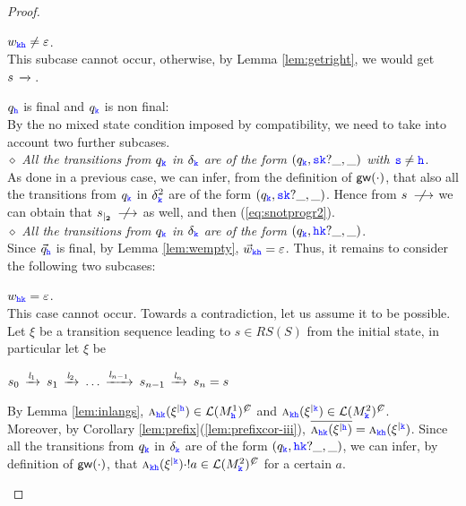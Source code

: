 \begin{proof}
\begin{description}
\begin{description}
\item 
$w_{\KK\HH}\neq\varepsilon$.\\
This subcase cannot occur, otherwise, by Lemma \ref{lem:getright}, we would get $s\lts{}$.
\end{description}


\item $q_\HH$ is final and $q_\KK$ is non final: \\
By the no mixed state condition imposed by compatibility, we need to take into account two further subcases.\\
\underline{$\diamond$} 
{\em  All the transitions from $q_\KK$ in $\delta_\KK$ are of the form $(q_\KK,\tts\KK?\_,\_)$ with $\tts\neq\HH$}.\\
As done in a previous case,  we can infer, from the definition of  $\gateway{\cdot}$, that also  all the transitions from $q_\KK$ in $\delta^2_\KK$ are of the form $(q_\KK,\tts\KK?\_,\_)$. Hence from $s\notlts{}$ we can  
obtain that $\restrict{s}{2}\notlts{}$ as well, and then  (\ref{eq:snotprogr2}).\\
\underline{$\diamond$} 
{\em  All the transitions from $q_\KK$ in $\delta_\KK$ are of the form $(q_\KK,\HH\KK?\_,\_)$}.\\
Since $\vec{q}_\HH$ is final, by Lemma \ref{lem:wempty}, $\vec{w}_{\KK\HH} = \varepsilon$. Thus, it remains to consider the following two subcases:
 \begin{description}
 \item
 ${w}_{\HH\KK}=\varepsilon$.\\
 This case cannot occur. Towards a contradiction, let us assume it to be possible.\\
Let $\xi$ be a transition sequence leading to $s\in RS(S)$ from the initial state, in particular let $\xi$ be\\
\centerline{
$s_0\lts{\elle_1}s_1\lts{\elle_2} \ldots \lts{\elle_{n-1}}s_{n-1}\lts{\elle_n}s_n=s$
}
 By Lemma \ref{lem:inlangs},
 $\symb{\HH\KK}{\restrictup{\xi}{\HH}}\in\lang{M^1_\HH}^\mC $ and $\symb{\KK\HH}{\restrictup{\xi}{\KK}}\in\lang{M^2_\KK}^\mC$. \\
 Moreover, by Corollary \ref{lem:prefix}(\ref{lem:prefixcor-iii}),
  $\Dual{\symb{\HH\KK}{\restrictup{\xi}{\HH}}}=\symb{\KK\HH}{\restrictup{\xi}{\KK}}$.
  Since all the transitions from $q_\KK$ in $\delta_\KK$ are of the form $(q_\KK,\HH\KK?\_,\_)$,
we can infer, by definition of $\gateway{\cdot}$, that  $\symb{\KK\HH}{\restrictup{\xi}{\KK}}\cdot !a\in\lang{M^2_\KK}^\mC$ for a certain $a$.


\end{description}
\end{description}
\end{proof}
